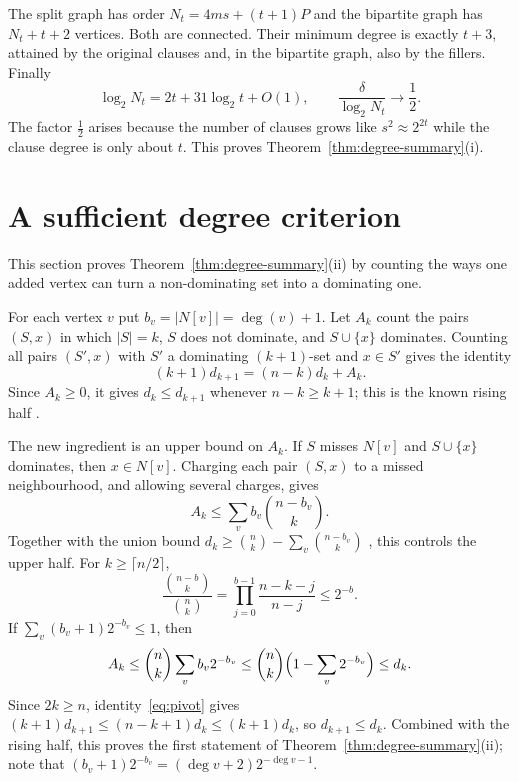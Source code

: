 \documentclass[11pt,a4paper]{article}
\theoremstyle{definition}
\theoremstyle{remark}
\begin{document}
The split graph has order $N_t=4ms+(t+1)P$ and the bipartite graph has $N_t+t+2$ vertices. Both are connected. Their minimum degree is exactly $t+3$, attained by the original clauses and, in the bipartite graph, also by the fillers. Finally
\[
\log_2N_t=2t+31\log_2t+O(1),\qquad
\frac{\delta}{\log_2N_t}\longrightarrow\frac12.
\]
The factor $\tfrac12$ arises because the number of clauses grows like $s^2\approx2^{2t}$ while the clause degree is only about $t$. This proves Theorem~\ref{thm:degree-summary}(i).

\section{A sufficient degree criterion}\label{sec:upper}
This section proves Theorem~\ref{thm:degree-summary}(ii) by counting the ways one added vertex can turn a non-dominating set into a dominating one.

For each vertex $v$ put $b_v=|N[v]|=\deg(v)+1$. Let $A_k$ count the pairs $(S,x)$ in which $|S|=k$, $S$ does not dominate, and $S\cup\{x\}$ dominates. Counting all pairs $(S',x)$ with $S'$ a dominating $(k+1)$-set and $x\in S'$ gives the identity
\begin{equation}\label{eq:pivot}
(k+1)d_{k+1}=(n-k)d_k+A_k .
\end{equation}
Since $A_k\ge0$, it gives $d_k\le d_{k+1}$ whenever $n-k\ge k+1$; this is the known rising half \cite[Proposition~2.4]{BB}.

The new ingredient is an upper bound on $A_k$. If $S$ misses $N[v]$ and $S\cup\{x\}$ dominates, then $x\in N[v]$. Charging each pair $(S,x)$ to a missed neighbourhood, and allowing several charges, gives
\begin{equation}\label{eq:Ak}
A_k\le\sum_v b_v\binom{n-b_v}{k}.
\end{equation}
Together with the union bound $d_k\ge\binom nk-\sum_v\binom{n-b_v}{k}$ \cite[Proposition~9]{Omar}, this controls the upper half. For $k\ge\lceil n/2\rceil$,
\[
\frac{\binom{n-b}{k}}{\binom nk}
=\prod_{j=0}^{b-1}\frac{n-k-j}{n-j}\le2^{-b}.
\]
If $\sum_v(b_v+1)2^{-b_v}\le1$, then
\[
A_k\le\binom nk\sum_v b_v2^{-b_v}\le\binom nk\Bigl(1-\sum_v2^{-b_v}\Bigr)\le d_k .
\]
Since $2k\ge n$, identity~\eqref{eq:pivot} gives $(k+1)d_{k+1}\le(n-k+1)d_k\le(k+1)d_k$, so $d_{k+1}\le d_k$. Combined with the rising half, this proves the first statement of Theorem~\ref{thm:degree-summary}(ii); note that $(b_v+1)2^{-b_v}=(\deg v+2)2^{-\deg v-1}$.
\end{document}
